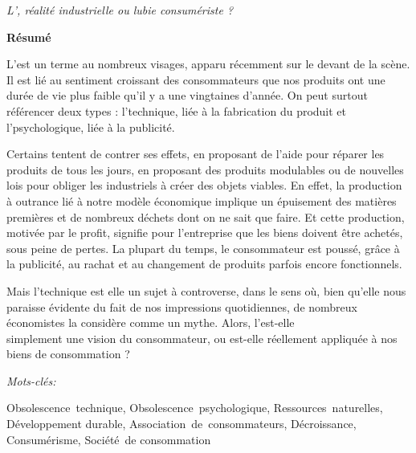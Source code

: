 \pagestyle{empty}

\begin{center}
\begin{LARGE}
\textit{L'\OP, réalité industrielle ou lubie consumériste ? }
\end{LARGE}
\end{center}


\begin{thmbox}[L]{\begin{Large}\textbf{Résumé}\end{Large}}
\vspace{0.25\baselineskip}
L'\op est un terme au nombreux visages, apparu récemment sur le devant de la scène. Il est lié au sentiment croissant des consommateurs que nos produits ont une durée de vie plus faible qu'il y a une vingtaines d'année. 
On peut surtout référencer deux types : l'\op technique, liée à la fabrication du produit et l'\op psychologique, liée à la publicité.

Certains tentent de contrer ses effets, en proposant de l'aide pour réparer les produits de tous les jours, en proposant des produits modulables ou de nouvelles lois pour obliger les industriels à créer des objets viables. 
En effet, la production à outrance lié à notre modèle économique implique un épuisement des matières premières et de nombreux déchets dont on ne sait que faire. Et cette production, motivée par le profit, signifie pour l'entreprise que les biens doivent être achetés, sous peine de pertes. La plupart du temps, le consommateur est poussé, grâce à la publicité, au rachat et au changement de produits parfois encore fonctionnels. 

Mais l'\op technique est elle un sujet à controverse, dans le sens où, bien qu'elle nous paraisse évidente du fait de nos impressions quotidiennes, de nombreux économistes la considère comme un mythe. Alors, l'\op est-elle \\simplement une vision du consommateur, ou est-elle réellement appliquée à nos biens de consommation ?
\end{thmbox}
\vspace{0.5\baselineskip}

\begin{large}\emph{Mots-clés:} \end{large}
\vspace{0.25\baselineskip}\noindent
Obsolescence~technique, Obsolescence~psychologique, Ressources~naturelles, Développement durable, Association~de~consommateurs, Décroissance, Consumérisme, Société~de consommation

